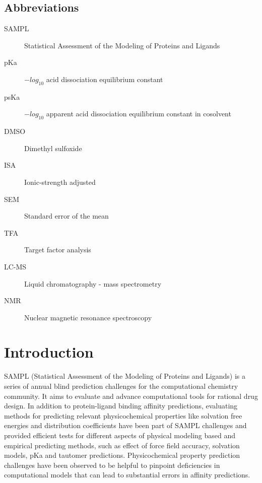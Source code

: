 \documentclass[9pt,lineno]{elife}
\begin{document}
\subsection{Abbreviations}
\begin{description}
\item[SAMPL] Statistical Assessment of the Modeling of Proteins and Ligands
\item[pKa] $-log_{10}$ acid dissociation equilibrium constant
\item[psKa] $-log_{10}$ apparent acid dissociation equilibrium constant in cosolvent
\item[DMSO] Dimethyl sulfoxide
\item[ISA] Ionic-strength adjusted
\item[SEM] Standard error of the mean
\item[TFA] Target factor analysis
\item[LC-MS] Liquid chromatography - mass spectrometry
\item[NMR] Nuclear magnetic resonance spectroscopy
\end{description}

\section{Introduction}

SAMPL (Statistical Assessment of the Modeling of Proteins and Ligands) is a series of annual blind prediction challenges for the computational chemistry community. It aims to evaluate and advance computational tools for rational drug design. In addition to protein-ligand binding affinity predictions, evaluating methods for predicting relevant physicochemical properties like solvation free energies and distribution coefficients have been part of SAMPL challenges and provided efficient tests for different aspects of physical modeling based and empirical predicting methods, such as effect of force field accuracy, solvation models, pKa and tautomer predictions. Physicochemical property prediction challenges have been observed to be helpful to pinpoint deficiencies in computational models that can lead to substantial errors in affinity predictions.
\end{document}
